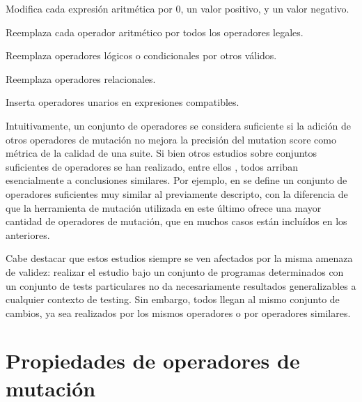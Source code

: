 \begin{description}[leftmargin=8em,style=nextline]
	\item[ABS] Modifica cada expresi\'on aritm\'etica por 0, un valor positivo, y un valor negativo.
	\item[AOR] Reemplaza cada operador aritm\'etico por todos los operadores legales.
	\item[LCR] Reemplaza operadores l\'ogicos o condicionales por otros v\'alidos.
	\item[ROR] Reemplaza operadores relacionales.
	\item[UOI] Inserta operadores unarios en expresiones compatibles.
\end{description}

Intuitivamente, un conjunto de operadores se considera suficiente si la adici\'on de otros operadores de mutaci\'on no mejora la precisi\'on del mutation score como m\'etrica de la calidad de una suite. Si bien otros estudios sobre conjuntos suficientes de operadores se han realizado, entre ellos \cite{bibliography.mutation.selection.ASN2008}, todos arriban esencialmente a conclusiones similares. Por ejemplo, en \cite{bibliography.mutation.selection.ASN2008} se define un conjunto de operadores suficientes muy similar al previamente descripto, con la diferencia de que la herramienta de mutaci\'on utilizada en este \'ultimo ofrece una mayor cantidad de operadores de mutaci\'on, que en muchos casos est\'an inclu\'idos en los anteriores.

Cabe destacar que estos estudios siempre se ven afectados por la misma amenaza de validez: realizar el estudio bajo un conjunto de programas determinados con un conjunto de tests particulares no da necesariamente resultados generalizables a cualquier contexto de testing. Sin embargo, todos llegan al mismo conjunto de cambios, ya sea realizados por los mismos operadores o por operadores similares.

\section{Propiedades de operadores de mutaci\'on}
\label{sec:preliminares.mutation.opevaluation}

